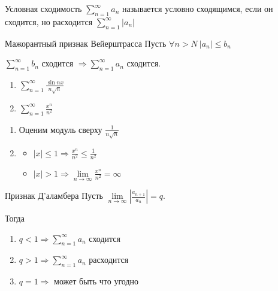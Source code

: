 \begin{defn}{Условная сходимость}{}
    \( \sum\limits_{n = 1}^{\infty} a_n \) называется условно сходящимся,
    если он сходится, но расходится \( \sum\limits_{n = 1}^{\infty} |a_n| \)
\end{defn}

\begin{thrm}{Мажорантный признак Вейерштрасса}{}
    Пусть \( \forall n > N \ |a_n| \leq b_n \)

    \( \sum\limits_{n = 1}^{\infty} b_n \) сходится \( \Rightarrow \sum\limits_{n = 1}^{\infty} a_n \) сходится.
\end{thrm}

\begin{example}{}{}
    \begin{enumerate}
        \item
            \( \displaystyle \sum\limits_{n = 1}^{\infty} \frac{\sin nx}{n \sqrt{n}} \)
        \item
            \( \displaystyle \sum\limits_{n = 1}^{\infty} \frac{x^n}{n^2} \)
    \end{enumerate}
\end{example}

\begin{enumerate}
    \item
        Оценим модуль сверху \( \frac{1}{n \sqrt{n}} \)
    \item
        \begin{itemize}
            \item 
                \( \displaystyle |x| \leq 1 \Rightarrow \frac{x^n}{n^2} \leq \frac{1}{n^2} \)
            \item
                \( \displaystyle |x| > 1 \Rightarrow \lim\limits_{n \to \infty} \frac{x^n}{n^2} = \infty \)
        \end{itemize}
\end{enumerate}

\begin{thrm}{Признак Д'аламбера}{}
    Пусть \( \lim\limits_{n \to \infty} \left| \frac{a_{n + 1}}{a_n} \right| = q \).

    Тогда
    \begin{enumerate}
        \item
            \( q < 1 \Rightarrow \sum\limits_{n = 1}^{\infty} a_n \) сходится
        \item
            \( q > 1 \Rightarrow \sum\limits_{n = 1}^{\infty} a_n \) расходится
        \item
            \( q = 1 \Rightarrow \) может быть что угодно
    \end{enumerate}
\end{thrm}

